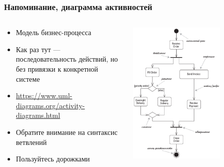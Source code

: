 \documentclass{../../slides-style}
\begin{document}
    \begin{frame}
        \frametitle{Напоминание, диаграмма активностей}
        \begin{columns}
            \begin{column}{0.5\textwidth}
                \begin{itemize}
                    \item Модель бизнес-процесса
                    \item Как раз тут --- последовательность действий, но без привязки к конкретной системе
                    \item \url{https://www.uml-diagrams.org/activity-diagrams.html}
                    \item Обратите внимание на синтаксис ветвлений
                    \item Пользуйтесь дорожками
                \end{itemize}
            \end{column}
            \begin{column}{0.5\textwidth}
                \begin{center}
                    \includegraphics[width=0.7\textwidth]{activityDiagram.png}
                \end{center}
            \end{column}
        \end{columns}
    \end{frame}
\end{document}
